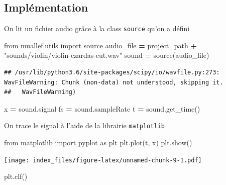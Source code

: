 \documentclass[]{article}
\newenvironment{Shaded}{\begin{snugshade}}{\end{snugshade}}
\newcommand{\ImportTok}[1]{#1}
\newcommand{\NormalTok}[1]{#1}
\newcommand{\OperatorTok}[1]{\textcolor[rgb]{0.81,0.36,0.00}{\textbf{#1}}}
\newcommand{\StringTok}[1]{\textcolor[rgb]{0.31,0.60,0.02}{#1}}
\begin{document}
\hypertarget{implementation}{%
\subsection{Implémentation}\label{implementation}}

On lit un fichier audio grâce à la class \texttt{source} qu'on a défini

\begin{Shaded}
\begin{Highlighting}[]
\ImportTok{from}\NormalTok{ muallef.utils }\ImportTok{import}\NormalTok{ source}
\NormalTok{audio_file }\OperatorTok{=}\NormalTok{ project_path }\OperatorTok{+} \StringTok{"sounds/violin/violin-czardas-cut.wav"}
\NormalTok{sound }\OperatorTok{=}\NormalTok{ source(audio_file)}
\end{Highlighting}
\end{Shaded}

\begin{verbatim}
## /usr/lib/python3.6/site-packages/scipy/io/wavfile.py:273: WavFileWarning: Chunk (non-data) not understood, skipping it.
##   WavFileWarning)
\end{verbatim}

\begin{Shaded}
\begin{Highlighting}[]
\NormalTok{x }\OperatorTok{=}\NormalTok{ sound.signal}
\NormalTok{fs }\OperatorTok{=}\NormalTok{ sound.sampleRate}
\NormalTok{t }\OperatorTok{=}\NormalTok{ sound.get_time()}
\end{Highlighting}
\end{Shaded}

On trace le signal à l'aide de la librairie \texttt{matplotlib}

\begin{Shaded}
\begin{Highlighting}[]
\ImportTok{from}\NormalTok{ matplotlib }\ImportTok{import}\NormalTok{ pyplot }\ImportTok{as}\NormalTok{ plt}
\NormalTok{plt.plot(t, x)}
\NormalTok{plt.show()}
\end{Highlighting}
\end{Shaded}

\texttt{[image: index\_files/figure-latex/unnamed-chunk-9-1.pdf]}

\begin{Shaded}
\begin{Highlighting}[]
\NormalTok{plt.clf()}
\end{Highlighting}
\end{Shaded}
\end{document}
